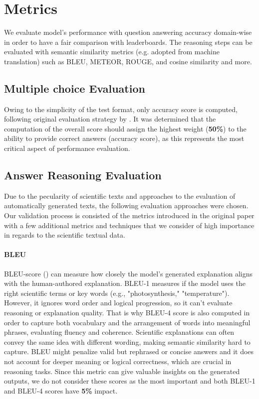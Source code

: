 \documentclass{article}
\begin{document}
\section{Metrics}
We evaluate model's performance with question answering accuracy domain-wise in order to have a fair comparison with leaderboards. The reasoning steps can be evaluated with semantic similarity metrics (e.g. adopted from machine translation) such as BLEU, METEOR, ROUGE, and cosine similarity and more.
\subsection{Multiple choice Evaluation}
Owing to the simplicity of the test format, only accuracy score is computed, following original evaluation strategy by \cite{lu2022learn}. It was determined that the computation of the overall score should assign the highest weight (\textbf{50\%}) to the ability to provide correct answers (accuracy score), as this represents the most critical aspect of performance evaluation.
\subsection{Answer Reasoning Evaluation}
Due to the pecularity of scientific texts and approaches to the evaluation of automatically generated texts, the following evaluation approaches were chosen. Our validation process is consisted of the metrics introduced in the original paper \cite{lu2022learn}  with a few additional metrics and techniques that we consider of high importance in regards to the scientific textual data.

\paragraph{BLEU}
BLEU-score (\cite{papineni2002bleu}) can measure how closely the model's generated explanation aligns with the human-authored explanation. BLEU-1 measures if the model uses the right scientific terms or key words (e.g., "photosynthesis," "temperature"). However, it ignores word order and logical progression, so it can’t evaluate reasoning or explanation quality. That is why BLEU-4 score is also computed in order to capture both vocabulary and the arrangement of words into meaningful phrases, evaluating fluency and coherence.
Scientific explanations can often convey the same idea with different wording, making semantic similarity hard to capture.
BLEU might penalize valid but rephrased or concise answers and it does not account for deeper meaning or logical correctness, which are crucial in reasoning tasks. Since this metric can give valuable insights on the generated outputs, we do not consider these scores as the most important and both BLEU-1 and BLEU-4 scores have \textbf{5\%} impact.
\end{document}
